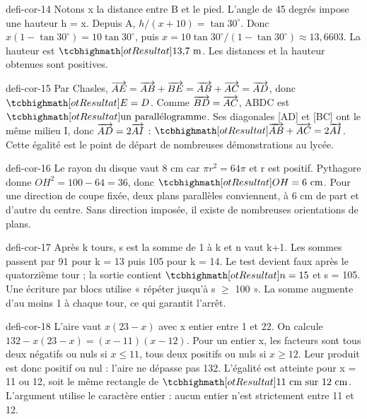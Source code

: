 \begin{blocEdition}{defi-cor-14}
Notons x la distance entre B et le pied. L’angle de 45 degrés impose une hauteur h = x. Depuis A, $h/(x+10)=\tan30^\circ$. Donc $x(1-\tan30^\circ)=10\tan30^\circ$, puis $x=10\tan30^\circ/(1-\tan30^\circ)\approx13{,}6603$. La hauteur est $\res{13{,}7\text{ m}}$. Les distances et la hauteur obtenues sont positives.\label{fig-defi-cor-14}

\end{blocEdition}
\begin{blocEdition}{defi-cor-15}
Par Chasles, $\overrightarrow{AE}=\overrightarrow{AB}+\overrightarrow{BE}=\overrightarrow{AB}+\overrightarrow{AC}=\overrightarrow{AD}$, donc $\res{E=D}$. Comme $\overrightarrow{BD}=\overrightarrow{AC}$, ABDC est $\res{\text{un parallélogramme}}$. Ses diagonales [AD] et [BC] ont le même milieu I, donc $\overrightarrow{AD}=2\overrightarrow{AI}$ : $\res{\vect{AB}+\vect{AC}=2\vect{AI}}$. Cette égalité est le point de départ de nombreuses démonstrations au lycée.\label{fig-defi-cor-15}

\end{blocEdition}
\begin{blocEdition}{defi-cor-16}
Le rayon du disque vaut 8 cm car $\pi r^2=64\pi$ et r est positif. Pythagore donne $OH^2=100-64=36$, donc $\res{OH=6\text{ cm}}$. Pour une direction de coupe fixée, deux plans parallèles conviennent, à 6 cm de part et d’autre du centre. Sans direction imposée, il existe de nombreuses orientations de plans.\label{fig-defi-cor-16}

\end{blocEdition}
\begin{blocEdition}{defi-cor-17}
Après k tours, s est la somme de 1 à k et n vaut k+1. Les sommes passent par 91 pour k = 13 puis 105 pour k = 14. Le test devient faux après le quatorzième tour ; la sortie contient $\res{n=15}$ et s = 105. Une écriture par blocs utilise « répéter jusqu’à s $\ge$ 100 ». La somme augmente d’au moins 1 à chaque tour, ce qui garantit l’arrêt.
\end{blocEdition}
\begin{blocEdition}{defi-cor-18}
L’aire vaut $x(23-x)$ avec x entier entre 1 et 22. On calcule $132-x(23-x)=(x-11)(x-12)$. Pour un entier x, les facteurs sont tous deux négatifs ou nuls si $x\le11$, tous deux positifs ou nuls si $x\ge12$. Leur produit est donc positif ou nul : l’aire ne dépasse pas 132. L’égalité est atteinte pour x = 11 ou 12, soit le même rectangle de $\res{11\text{ cm sur }12\text{ cm}}$. L’argument utilise le caractère entier : aucun entier n’est strictement entre 11 et 12.
\end{blocEdition}
